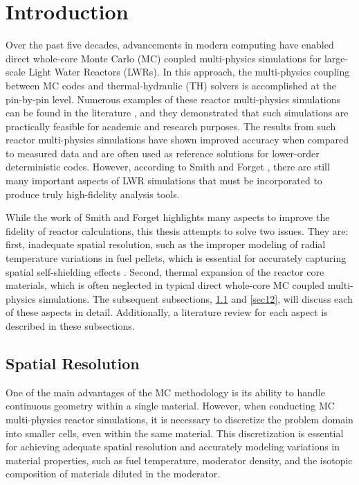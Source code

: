 \section{Introduction} \label{s1}

Over the past five decades, advancements in modern computing have enabled direct whole-core Monte Carlo (MC) coupled multi-physics simulations for large-scale Light Water Reactors (LWRs). In this approach, the multi-physics coupling between MC codes and thermal-hydraulic (TH) solvers is accomplished at the pin-by-pin level. Numerous examples of these reactor multi-physics simulations can be found in the literature \cite{tung_2020,kelly_2017,ma_2019}, and they demonstrated that such simulations are practically feasible for academic and research purposes. The results from such reactor multi-physics simulations have shown improved accuracy when compared to measured data and are often used as reference solutions for lower-order deterministic codes. However, according to Smith and Forget \cite{smith_2013}, there are still many important aspects of LWR simulations that must be incorporated to produce truly high-fidelity analysis tools.

While the work of Smith and Forget highlights many aspects to improve the fidelity of reactor calculations, this thesis attempts to solve two issues. They are: first, inadequate spatial resolution, such as the improper modeling of radial temperature variations in fuel pellets, which is essential for accurately capturing spatial self-shielding effects \cite{smith_2013, nchoi_2020}. Second, thermal expansion of the reactor core materials, which is often neglected in typical direct whole-core MC coupled multi-physics simulations. The subsequent subsections, \ref{sec11} and \ref{sec12}, will discuss each of these aspects in detail. Additionally, a literature review for each aspect is described in these subsections.

\subsection{Spatial Resolution} \label{sec11}

One of the main advantages of the MC methodology is its ability to handle continuous geometry within a single material. However, when conducting MC multi-physics reactor simulations, it is necessary to discretize the problem domain into smaller cells, even within the same material. This discretization is essential for achieving adequate spatial resolution and accurately modeling variations in material properties, such as fuel temperature, moderator density, and the isotopic composition of materials diluted in the moderator.

